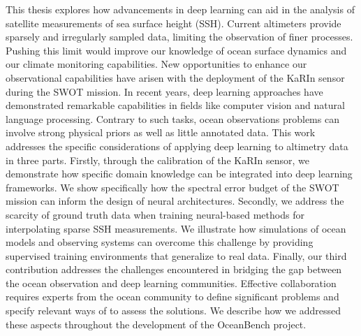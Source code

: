 \begin{bibunit}


This thesis explores how advancements in deep learning can aid in the analysis of satellite measurements of sea surface height (SSH).
Current altimeters provide sparsely and irregularly sampled data, limiting the observation of finer processes.
Pushing this limit would improve our knowledge of ocean surface dynamics and our climate monitoring capabilities.
New opportunities to enhance our observational capabilities have arisen with the deployment of the KaRIn sensor during the SWOT mission.
In recent years, deep learning approaches have demonstrated remarkable capabilities in fields like computer vision and natural language processing.
Contrary to such tasks, ocean observations problems can involve strong physical priors as well as little annotated data.
This work addresses the specific considerations of applying deep learning to altimetry data in three parts.
Firstly, through the calibration of the KaRIn sensor, we demonstrate how specific domain knowledge can be integrated into deep learning frameworks. We show specifically how the spectral error budget of the SWOT mission can inform the design of neural architectures.
Secondly, we address the scarcity of ground truth data when training neural-based methods for interpolating sparse SSH measurements. We illustrate how simulations of ocean models and observing systems can overcome this challenge by providing supervised training environments that generalize to real data.
Finally, our third contribution addresses the challenges encountered in bridging the gap between the ocean observation and deep learning communities. Effective collaboration requires experts from the ocean community to define significant problems and specify relevant ways of to assess the solutions.
We describe how we addressed these aspects throughout the development of the OceanBench project.


\end{bibunit}
